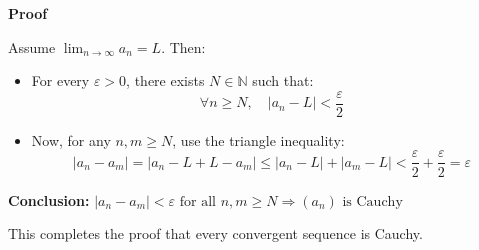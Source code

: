 \textbf{Proof}

Assume \( \lim_{n \to \infty} a_n = L \). Then:

\begin{itemize}[label=\(-\)]
    \item For every \( \varepsilon > 0 \), there exists \( N \in \mathbb{N} \) such that:
    \[
    \forall n \ge N, \quad |a_n - L| < \frac{\varepsilon}{2}
    \]

    \item Now, for any \( n, m \ge N \), use the triangle inequality:
    \[
    |a_n - a_m| = |a_n - L + L - a_m| \le |a_n - L| + |a_m - L| < \frac{\varepsilon}{2} + \frac{\varepsilon}{2} = \varepsilon
    \]
\end{itemize}

\textbf{Conclusion:}  
\(
|a_n - a_m| < \varepsilon \text{ for all } n, m \ge N \Rightarrow (a_n) \text{ is Cauchy}
\)

This completes the proof that every convergent sequence is Cauchy.

\QED
\newpage